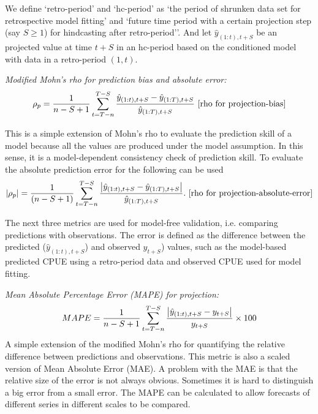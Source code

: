 We  define `retro-period' and `hc-period' as `the period of shrunken data set for retrospective model fitting' and `future time period with a certain projection step (say $S \geq 1$) for hindcasting after retro-period''. And let $\hat{y}_{(1:t),t+S}$ be an projected value at time $t+S$ in an hc-period based on the conditioned model with data in a retro-period $(1,t)$. 

\vspace{0.2cm} \noindent
{\it Modified Mohn's rho for prediction bias and absolute error:}\\
\begin{equation}
\rho_p = \displaystyle \frac{1}{n-S+1} \sum_{t=T-n}^{T-S} 
\frac{\hat{y}_{(1:t),t+S}-\hat{y}_{(1:T),t+S}}{\hat{y}_{(1:T),t+S}} 
\ \mbox{[rho for projection-bias]}
\end{equation} 

This is a simple extension of Mohn's rho to evaluate the prediction skill of a model because all the values are produced under the model assumption. In this sense, it is a model-dependent consistency check of prediction skill. To evaluate the absolute prediction error for the following can be used
\begin{equation}
|\rho_p| = \displaystyle \frac{1}{(n-S+1)} \sum_{t=T-n}^{T-S}
\frac{\left| \hat{y}_{(1:t),t+S}-\hat{y}_{(1:T),t+S} \right|}{\hat{y}_{(1:T),t+S}}. 
\ \mbox{[rho for projection-absolute-error]}
\end{equation} 

\vspace{0.2cm} 
The next three metrics are used for model-free validation, i.e. comparing predictions with observations. The error is defined as the difference between the predicted ($\hat{y}_{(1:t),t+S}$) and observed $y_{t+S}$) values, such as the model-based predicted CPUE using a retro-period data and observed CPUE used for model fitting. 

\vspace{0.2cm} \noindent
{\it Mean Absolute Percentage Error (MAPE) for projection:}
\begin{equation}
MAPE = \displaystyle \frac{1}{n-S+1} \sum_{t=T-n}^{T-S}
\frac{\left| \hat{y}_{(1:t),t+S}-y_{t+S} \right|}{y_{t+S}} \times 100 
\end{equation} 
A simple extension of the modified Mohn's rho for quantifying the relative difference between predictions and observations. This metric is also a scaled version of Mean Absolute Error (MAE). A problem with the MAE is that the relative size of the error is not always obvious. Sometimes it is hard to distinguish a big error from a small error. The MAPE can be calculated to allow forecasts of different series in different scales to be compared.

